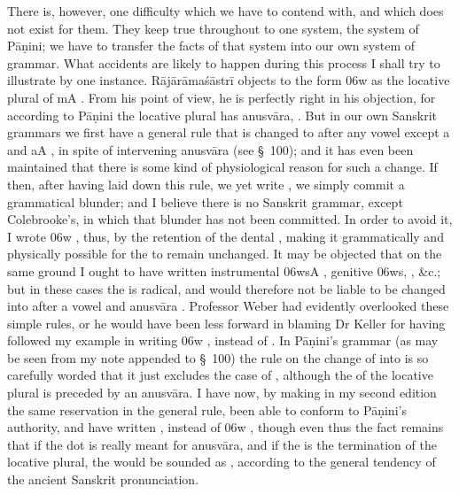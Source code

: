 There is, however, one difficulty which we have to contend with, and
which does not exist for them. They keep true throughout to one system,
the system of Pāṇini; we have to transfer the facts of that system into
our own system of grammar. What accidents are likely to happen during
this process I shall try to illustrate by one instance. Rājārāmaśāstrī
objects to the form {\dn {}\306w}  as the locative plural of
{\dn {}mA} . From his point of view, he is perfectly right in
his objection, for according to Pāṇini the locative plural has anusvāra,
{\dn {}\2} . But in our own Sanskrit grammars we first have a
general rule that {\dn {}}  is changed to {\dn {}}  after any vowel
except {\dn a} and {\dn aA} , in spite of intervening anusvāra
(see \S~100); and it has even been maintained that there is some kind of
physiological reason for such a change. If then, after having laid down
this rule, we yet write {\dn {}\2} , we simply commit a
grammatical blunder; and I believe there is no Sanskrit grammar, except
Colebrooke's, in which that blunder has not been committed. In order to
avoid it, I wrote {\dn {}\306w} , thus, by the retention of the
dental {\dn {}} , making it grammatically and physically possible for
the {\dn {}}  to remain unchanged. It may be objected that on the same
ground I ought to have written instrumental {\dn {}\306wsA} ,
genitive {\dn {}\306ws,} , \&c.; but in these cases the {\dn {}} 
is radical, and would therefore not be liable to be changed into {\dn {}}
 after a vowel and anusvāra . Professor Weber had
evidently overlooked these simple rules, or he would have been less
forward in blaming Dr Keller for having followed my example in writing
{\dn {}\306w} , instead of {\dn {}\2} . In Pāṇini's grammar
(as may be seen from my note appended to \S~100) the rule on the change
of {\dn {}}  into {\dn {}}  is so carefully worded that it just
excludes the case of {\dn {}\2} , although the {\dn {}}  of
the locative plural is preceded by an anusvāra. I have now, by making in
my second edition the same reservation in the general rule, been able to
conform to Pāṇini's authority, and have written {\dn {}\2} ,
instead of {\dn {}\306w} , though even thus the fact remains that if
the dot is really meant for anusvāra, and if the {\dn {}}  is the
termination of the locative plural, the {\dn {}}  would be sounded as
{\dn {}} , according to the general tendency of the ancient Sanskrit
pronunciation.

